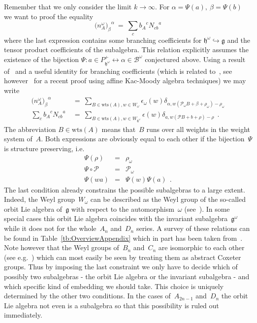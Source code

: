 \documentclass[12pt,a4paper]{article}
\newcommand{\mf}{\mathfrak} %
\newcommand{\mc}{\mathcal} %
\def\Iso{\Psi}
\def\sg{\mf{h}^\omega} %
\def\ig{\mf{g}^\omega} %
\def\bL{\mc{B}} %
\def\treps{\bL^\omega} %
\begin{document}
\begin{appendix}
Remember that we only consider the limit $k\rightarrow\infty$.
For $\alpha=\Iso(a),\:\beta=\Iso(b)$ we want to
proof the equality
\begin{equation*}
  {\bigl(n_A^\omega\bigr)_{\beta}}^{\alpha}
  \ =\ \sum_c {b_A}^c {N_{cb}}^a
\end{equation*}
where the last expression contains some branching coefficients for
$\sg\hookrightarrow\mf{g}$ and the tensor product coefficients of
the subalgebra. This relation explicitly assumes the existence of the
bijection $\Iso:a\in P_{\sg}^+\leftrightarrow\alpha\in\treps$
conjectured above. Using a result of~\cite{Quella:2002wi}
and a useful identity for 
branching coefficients (which is related to~\cite{Klimyk:1967}, see 
however~\cite{Quella:2001wh} for a recent proof using affine 
Kac-Moody algebra techniques) we may write
\begin{equation}
  \label{eq:NIMrepComparison}
  \begin{split}
  {\bigl(n_A^\omega\bigr)_{\beta}}^{\alpha}
  &\ =\ \sum_{B\in\text{wts}(A),w\in W_{\omega}}\epsilon_{\omega}(w)
  \delta_{\alpha,w(\mathcal{P}_{\omega}B+\beta+\rho_\omega)-\rho_\omega}\\[2mm]
  \sum_c {b_A}^c {N_{cb}}^a
  &\ =\ \sum_{B\in\text{wts}(A),w\in W_{\sg}}\epsilon(w)
  \delta_{a,w(\mathcal{P}B+b+\rho)-\rho}\ \ .
  \end{split}
\end{equation}
The abbreviation $B\in\text{wts}(A)$ means that~$B$ runs over all weights
in the weight system of~$A$. Both expressions are obviously equal to each  
other if the bijection~$\Iso$ is structure preserving, i.e.
\begin{eqnarray*}
  \Iso(\rho)&=&\rho_\omega\\[2mm] 
  \Iso\circ\mc{P}&=&\mc{P}_{\omega}\\[2mm] 
  \Iso(wa)&=&\Iso(w)\Iso(a)\ \ .
\end{eqnarray*}
The last condition already constrains the possible subalgebras to
a large extent. Indeed, the Weyl group~$W_\omega$ can be described as
the Weyl group of the so-called orbit Lie algebra of~$\mf{g}$ with 
respect to the automorphism~$\omega$ (see~\cite{Fuchs:1996zr}).
In some special cases this orbit Lie algebra coincides with the 
invariant subalgebra~$\ig$ while it does not for the whole~$A_{n}$ 
and~$D_n$ series. A survey of these relations can be found in 
Table~\ref{tb:OverviewAppendix} which in part has been taken 
from~\cite{Birke:1999ik}. Note however that the Weyl groups 
of~$B_n$ and~$C_n$ are isomorphic to each other (see 
e.g.~\cite[p.~74]{Fuchs:1995}) which can most easily be seen 
by treating them as abstract Coxeter groups. Thus by imposing
the last constraint we only have to decide which of possibly two
subalgebras - the orbit Lie algebra or the invariant subalgebra -
and which specific kind of embedding we should take. This choice 
is uniquely determined by the other two conditions. In the cases 
of~$A_{2n-1}$ and~$D_n$ the orbit Lie algebra not even is a 
subalgebra so that this possibility is ruled out immediately.
\smallskip


\end{appendix}
\end{document}
